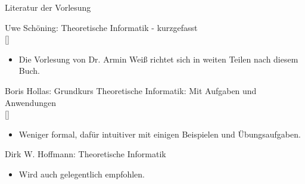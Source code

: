 \begin{frame}{Literatur der Vorlesung}
    \small{Uwe Schöning: Theoretische Informatik - kurzgefasst\\
    \phantom{}[]
    \begin{itemize}
        \item Die Vorlesung von Dr. Armin Weiß richtet sich in weiten Teilen nach diesem Buch.
    \end{itemize}
    Boris Hollas: Grundkurs Theoretische Informatik: Mit Aufgaben und Anwendungen \\
    \phantom{}[]\\
    \begin{itemize}
        \item Weniger formal, dafür intuitiver mit einigen Beispielen und Übungsaufgaben.
    \end{itemize}
    Dirk W. Hoffmann: Theoretische Informatik
    \begin{itemize}
        \item Wird auch gelegentlich empfohlen.
    \end{itemize}}
    
\end{frame}
